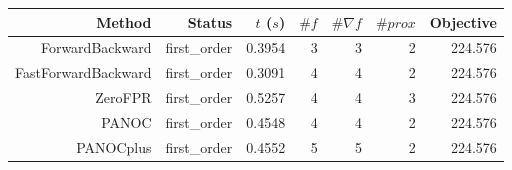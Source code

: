 \begin{tabular}{rrrrrrr}
  \toprule
  \textbf{Method} & \textbf{Status} & \textbf{$t$ ($s$)} & \textbf{$\#f$} & \textbf{$\#\nabla f$} & \textbf{$\#prox$} & \textbf{Objective} \\
  \midrule
  ForwardBackward & first\_order & 0.3954 & 3 & 3 & 2 & 224.576 \\
  FastForwardBackward & first\_order & 0.3091 & 4 & 4 & 2 & 224.576 \\
  ZeroFPR & first\_order & 0.5257 & 4 & 4 & 3 & 224.576 \\
  PANOC & first\_order & 0.4548 & 4 & 4 & 2 & 224.576 \\
  PANOCplus & first\_order & 0.4552 & 5 & 5 & 2 & 224.576 \\
  \bottomrule
\end{tabular}

